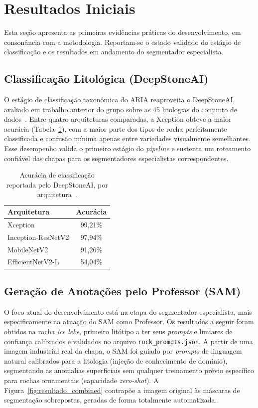 \documentclass[12pt]{article}
\begin{document}
\section{Resultados Iniciais}
\label{sec:resultados}

Esta seção apresenta as primeiras evidências práticas do desenvolvimento, em consonância com a metodologia. Reportam-se o estado validado do estágio de classificação e os resultados em andamento do segmentador especialista.

\subsection{Classificação Litológica (DeepStoneAI)}

O estágio de classificação taxonômica do ARIA reaproveita o DeepStoneAI, avaliado em trabalho anterior do grupo sobre as 45 litologias do conjunto de dados~\cite{deepstoneai_moreira2025}. Entre quatro arquiteturas comparadas, a Xception obteve a maior acurácia (Tabela~\ref{tab:deepstone}), com a maior parte dos tipos de rocha perfeitamente classificada e confusão mínima apenas entre variedades visualmente semelhantes. Esse desempenho valida o primeiro estágio do \textit{pipeline} e sustenta um roteamento confiável das chapas para os segmentadores especialistas correspondentes.

\begin{table}[ht]
\centering
\caption{Acurácia de classificação reportada pelo DeepStoneAI, por arquitetura~\cite{deepstoneai_moreira2025}.}
\label{tab:deepstone}
\begin{tabular}{lc}
\hline
\textbf{Arquitetura} & \textbf{Acurácia} \\
\hline
Xception & 99,21\% \\
Inception-ResNetV2 & 97,94\% \\
MobileNetV2 & 91,26\% \\
EfficientNetV2-L & 54,04\% \\
\hline
\end{tabular}
\end{table}

\subsection{Geração de Anotações pelo Professor (SAM)}

O foco atual do desenvolvimento está na etapa do segmentador especialista, mais especificamente na atuação do SAM como Professor. Os resultados a seguir foram obtidos na rocha \textit{ice leke}, primeiro litótipo a ter seus \textit{prompts} e limiares de confiança calibrados e validados no arquivo \texttt{rock\_prompts.json}. A partir de uma imagem industrial real da chapa, o SAM foi guiado por \textit{prompts} de linguagem natural calibrados para a litologia (injeção de conhecimento de domínio), segmentando as anomalias superficiais sem qualquer treinamento prévio específico para rochas ornamentais (capacidade \textit{zero-shot}). A Figura~\ref{fig:resultado_combined} contrapõe a imagem original às máscaras de segmentação sobrepostas, geradas de forma totalmente automatizada.
\end{document}

